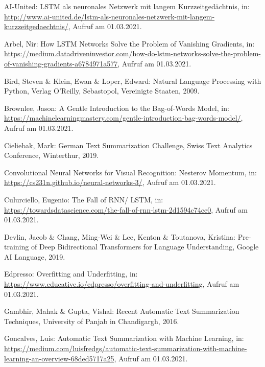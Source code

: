 \setcounter{page}{50}

\begin{thebibliography}{50}
\thispagestyle{fancy}

AI-United: LSTM als neuronales Netzwerk mit langem Kurzzeitgedächtnis, in: \url{http://www.ai-united.de/lstm-als-neuronales-netzwerk-mit-langem-kurzzeitgedaechtnis/}, Aufruf am 01.03.2021.

Arbel, Nir: How LSTM Networks Solve the Problem of Vanishing Gradients, in: \url{https://medium.datadriveninvestor.com/how-do-lstm-networks-solve-the-problem-of-vanishing-gradients-a6784971a577}, Aufruf am 01.03.2021.

Bird, Steven \& Klein, Ewan \& Loper, Edward: Natural Language Processing with Python, Verlag O'Reilly, Sebastopol, Vereinigte Staaten, 2009.

Brownlee, Jason: A Gentle Introduction to the Bag-of-Words Model, in: \url{https://machinelearningmastery.com/gentle-introduction-bag-words-model/}, Aufruf am 01.03.2021.

Cieliebak, Mark: German Text Summarization Challenge, Swiss Text Analytics Conference, Winterthur, 2019.

Convolutional Neural Networks for Visual Recognition: Nesterov Momentum, in: \url{https://cs231n.github.io/neural-networks-3/}, Aufruf am 01.03.2021.

Culurciello, Eugenio: The Fall of RNN/ LSTM, in: \url{https://towardsdatascience.com/the-fall-of-rnn-lstm-2d1594c74ce0}, Aufruf am 01.03.2021.

Devlin, Jacob \& Chang, Ming-Wei \& Lee, Kenton \& Toutanova, Kristina: Pre-training of Deep Bidirectional Transformers for
Language Understanding, Google AI Language, 2019.

Edpresso: Overfitting and Underfitting, in: \url{https://www.educative.io/edpresso/overfitting-and-underfitting}, Aufruf am 01.03.2021.

Gambhir, Mahak \& Gupta, Vishal: Recent Automatic Text Summarization Techniques, University of Panjab in Chandigargh, 2016.

Goncalves, Luis: Automatic Text Summarization with Machine Learning, in: \url{https://medium.com/luisfredgs/automatic-text-summarization-with-machine-learning-an-overview-68ded5717a25}, Aufruf am 01.03.2021.


\end{thebibliography}
